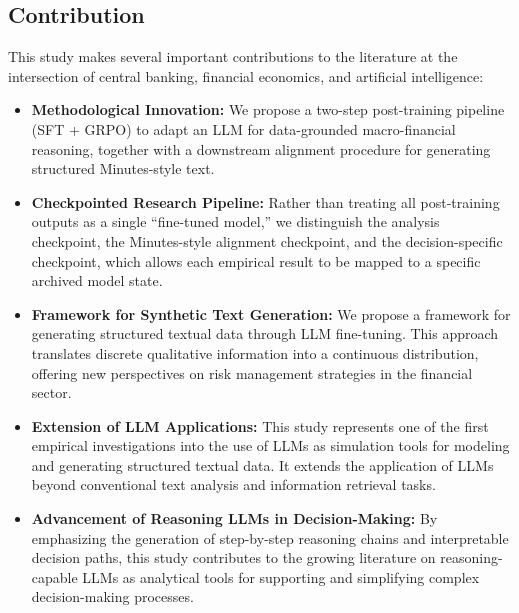 

\subsection*{Contribution}

This study makes several important contributions to the literature at the intersection of central banking, financial economics, and artificial intelligence:

\begin{itemize}
\item[] \textbf{Methodological Innovation:} We propose a two-step post-training pipeline (SFT + GRPO) to adapt an LLM for data-grounded macro-financial reasoning, together with a downstream alignment procedure for generating structured Minutes-style text.

\item[] \textbf{Checkpointed Research Pipeline:} Rather than treating all post-training outputs as a single ``fine-tuned model,'' we distinguish the analysis checkpoint, the Minutes-style alignment checkpoint, and the decision-specific checkpoint, which allows each empirical result to be mapped to a specific archived model state.

\item[] \textbf{Framework for Synthetic Text Generation:} We propose a framework for generating structured textual data through LLM fine-tuning. This approach translates discrete qualitative information into a continuous distribution, offering new perspectives on risk management strategies in the financial sector.

\item[] \textbf{Extension of LLM Applications:} This study represents one of the first empirical investigations into the use of LLMs as simulation tools for modeling and generating structured textual data. It extends the application of LLMs beyond conventional text analysis and information retrieval tasks.

\item[] \textbf{Advancement of Reasoning LLMs in Decision-Making:} By emphasizing the generation of step-by-step reasoning chains and interpretable decision paths, this study contributes to the growing literature on reasoning-capable LLMs as analytical tools for supporting and simplifying complex decision-making processes.


\end{itemize}
